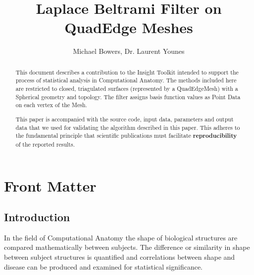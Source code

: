 \documentclass{InsightArticle}
\title{Laplace Beltrami Filter on QuadEdge Meshes}
\author{Michael Bowers, Dr. Laurent Younes}
\newcommand{\IJhandlerIDnumber}{3063}
\begin{document}
%
% 
\IJhandlefooter{\IJhandlerIDnumber}


\ifpdf
\else
\fi


\maketitle


\ifhtml
\chapter*{Front Matter\label{front}}
\fi


\begin{abstract}
\noindent
This document describes a contribution to the Insight Toolkit intended to
support the process of statistical analysis in Computational Anatomy.
The methods included here are
restricted to closed, triagulated surfaces (represented by a QuadEdgeMesh) 
with a Spherical geometry and
topology.  The filter assigns basis function values as Point Data on each 
vertex of the Mesh.

This paper is accompanied with the source code, input data, parameters and
output data that we used for validating the algorithm described in this paper.
This adheres to the fundamental principle that scientific publications must
facilitate \textbf{reproducibility} of the reported results.
\end{abstract}

\tableofcontents

\section{Introduction}

In the field of Computational Anatomy the shape of biological structures are
compared mathematically between subjects.  The difference or similarity in shape
between subject structures is quantified and correlations between shape and
disease can be produced and examined for statistical significance.
\end{document}
